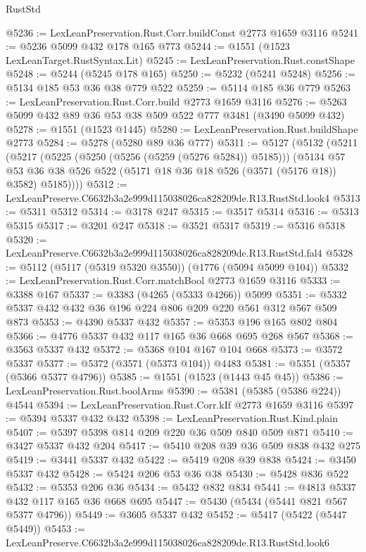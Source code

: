 \begin{lexlean}{RustStd}
\begin{coremodule}
@5236 := LexLeanPreservation.Rust.Corr.buildConst @2773 @1659 @3116
@5241 := @5236 @5099 @432 @178 @165 @773
@5244 := @1551 (@1523 LexLeanTarget.RustSyntax.Lit)
@5245 := LexLeanPreservation.Rust.constShape
@5248 := @5244 (@5245 @178 @165)
@5250 := @5232 (@5241 @5248)
@5256 := @5134 @185 @53 @36 @38 @779 @522
@5259 := @5114 @185 @36 @779
@5263 := LexLeanPreservation.Rust.Corr.build @2773 @1659 @3116
@5276 := @5263 @5099 @432 @89 @36 @53 @38 @509 @522 @777 @3481 (@3490 @5099 @432)
@5278 := @1551 (@1523 @1445)
@5280 := LexLeanPreservation.Rust.buildShape @2773
@5284 := @5278 (@5280 @89 @36 @777)
@5311 := @5127
    (@5132
      (@5211
        (@5217
          (@5225 (@5250 (@5256 (@5259 (@5276 @5284)) @5185)))
          (@5134
            @57
            @53
            @36
            @38
            @526
            @522
            (@5171 @18 @36 @18 @526 (@3571 (@5176 @18)) @3582)
            @5185))))
@5312 := LexLeanPreserve.C6632b3a2e999d115038026ca828209de.R13.RustStd.look4
@5313 := @5311 @5312
@5314 := @3178 @247
@5315 := @3517 @5314
@5316 := @5313 @5315
@5317 := @3201 @247
@5318 := @3521 @5317
@5319 := @5316 @5318
@5320 := LexLeanPreserve.C6632b3a2e999d115038026ca828209de.R13.RustStd.fal4
@5328 := @5112 (@5117 (@5319 @5320 @3550)) (@1776 (@5094 @5099 @104))
@5332 := LexLeanPreservation.Rust.Corr.matchBool @2773 @1659 @3116
@5333 := @3388 @167
@5337 := @3383 (@4265 (@5333 @4266)) @5099
@5351 := @5332 @5337 @432 @432 @36 @196 @224 @806 @209 @220 @561 @312 @567 @509 @873
@5353 := @4390 @5337 @432
@5357 := @5353 @196 @165 @802 @804
@5366 := @4776 @5337 @432 @117 @165 @36 @668 @695 @268 @567
@5368 := @3563 @5337 @432
@5372 := @5368 @104 @167 @104 @668
@5373 := @3572 @5337
@5377 := @5372 (@3571 (@5373 @104)) @4483
@5381 := @5351 (@5357 (@5366 @5377 @4796))
@5385 := @1551 (@1523 (@1443 @45 @45))
@5386 := LexLeanPreservation.Rust.boolArms
@5390 := @5381 (@5385 (@5386 @224)) @4544
@5394 := LexLeanPreservation.Rust.Corr.kIf @2773 @1659 @3116
@5397 := @5394 @5337 @432 @432
@5398 := LexLeanPreservation.Rust.Kind.plain
@5407 := @5397 @5398 @814 @209 @220 @36 @509 @840 @509 @871
@5410 := @3427 @5337 @432 @204
@5417 := @5410 @208 @39 @36 @509 @838 @432 @275
@5419 := @3441 @5337 @432
@5422 := @5419 @208 @39 @838
@5424 := @3450 @5337 @432
@5428 := @5424 @206 @53 @36 @38
@5430 := @5428 @836 @522
@5432 := @5353 @206 @36
@5434 := @5432 @832 @834
@5441 := @4813 @5337 @432 @117 @165 @36 @668 @695
@5447 := @5430 (@5434 (@5441 @821 @567 @5377 @4796))
@5449 := @3605 @5337 @432
@5452 := @5417 (@5422 (@5447 @5449))
@5453 := LexLeanPreserve.C6632b3a2e999d115038026ca828209de.R13.RustStd.look6

\end{coremodule}
\end{lexlean}

